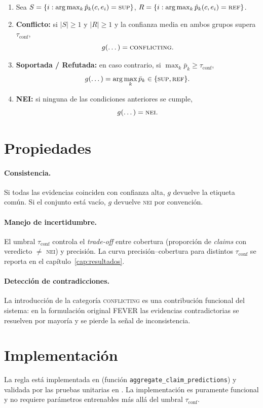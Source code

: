 \begin{enumerate}[leftmargin=*,itemsep=0.3em]
  \item Sea $S = \{i : \arg\max_k \hat{p}_k(c, e_i) = \textsc{sup}\}$,
        $R = \{i : \arg\max_k \hat{p}_k(c, e_i) = \textsc{ref}\}$.
  \item \textbf{Conflicto:} si $|S| \geq 1$ y $|R| \geq 1$ y la
        confianza media en ambos grupos supera $\tau_{\text{conf}}$,
        \[
          g(\dots) = \textsc{conflicting}.
        \]
  \item \textbf{Soportada / Refutada:} en caso contrario, si
        $\max_k \bar{p}_k \geq \tau_{\text{conf}}$,
        \[
          g(\dots) = \arg\max_k \bar{p}_k \in
          \{\textsc{sup}, \textsc{ref}\}.
        \]
  \item \textbf{NEI:} si ninguna de las condiciones anteriores se
        cumple,
        \[
          g(\dots) = \textsc{nei}.
        \]
\end{enumerate}

\section{Propiedades}

\paragraph{Consistencia.} Si todas las evidencias coinciden con
confianza alta, $g$ devuelve la etiqueta común. Si el conjunto está
vacío, $g$ devuelve \textsc{nei} por convención.

\paragraph{Manejo de incertidumbre.} El umbral $\tau_{\text{conf}}$
controla el \emph{trade-off} entre cobertura
(proporción de \emph{claims} con veredicto $\neq$ \textsc{nei}) y
precisión. La curva precisión--cobertura para distintos
$\tau_{\text{conf}}$ se reporta en el capítulo~\ref{cap:resultados}.

\paragraph{Detección de contradicciones.} La introducción de la
categoría \textsc{conflicting} es una contribución funcional del
sistema: en la formulación original FEVER las evidencias contradictorias
se resuelven por mayoría y se pierde la señal de inconsistencia.

\section{Implementación}

La regla está implementada en
 (función
\texttt{aggregate\_claim\_predictions}) y validada por las pruebas
unitarias en . La implementación es
puramente funcional y no requiere parámetros entrenables más allá del
umbral $\tau_{\text{conf}}$.
